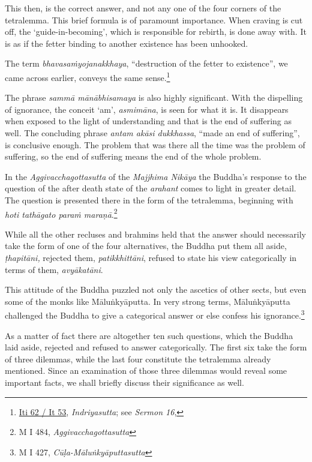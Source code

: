 This then, is the correct answer, and not any one of the four corners of the tetralemma. This brief formula is of paramount importance. When craving is cut off, the `guide-in-becoming', which is responsible for rebirth, is done away with. It is as if the fetter binding to another existence has been unhooked.

The term \emph{bhavasaṁyojanakkhaya}, ``destruction of the fetter to existence'', we came across earlier, conveys the same sense.\footnote{\href{https://suttacentral.net/iti62/pli/ms}{Iti 62 / It 53}, \emph{Indriyasutta}; see \emph{Sermon 16},}

The phrase \emph{sammā mānābhisamaya} is also highly significant. With the dispelling of ignorance, the conceit `am', \emph{asmimāna}, is seen for what it is. It disappears when exposed to the light of understanding and that is the end of suffering as well. The concluding phrase \emph{antam akāsi dukkhassa}, ``made an end of suffering'', is conclusive enough. The problem that was there all the time was the problem of suffering, so the end of suffering means the end of the whole problem.

In the \emph{Aggivacchagottasutta} of the \emph{Majjhima Nikāya} the Buddha's response to the question of the after death state of the \emph{arahant} comes to light in greater detail. The question is presented there in the form of the tetralemma, beginning with \emph{hoti tathāgato paraṁ maraṇā}.\footnote{M I 484, \emph{Aggivacchagottasutta}}

While all the other recluses and brahmins held that the answer should necessarily take the form of one of the four alternatives, the Buddha put them all aside, \emph{ṭhapitāni,} rejected them, \emph{patikkhittāni}, refused to state his view categorically in terms of them, \emph{avyākatāni}.

This attitude of the Buddha puzzled not only the ascetics of other sects, but even some of the monks like Māluṅkyāputta. In very strong terms, Māluṅkyāputta challenged the Buddha to give a categorical answer or else confess his ignorance.\footnote{M I 427, \emph{Cūḷa-Māluṅkyāputtasutta}}

As a matter of fact there are altogether ten such questions, which the Buddha laid aside, rejected and refused to answer categorically. The first six take the form of three dilemmas, while the last four constitute the tetralemma already mentioned. Since an examination of those three dilemmas would reveal some important facts, we shall briefly discuss their significance as well.

